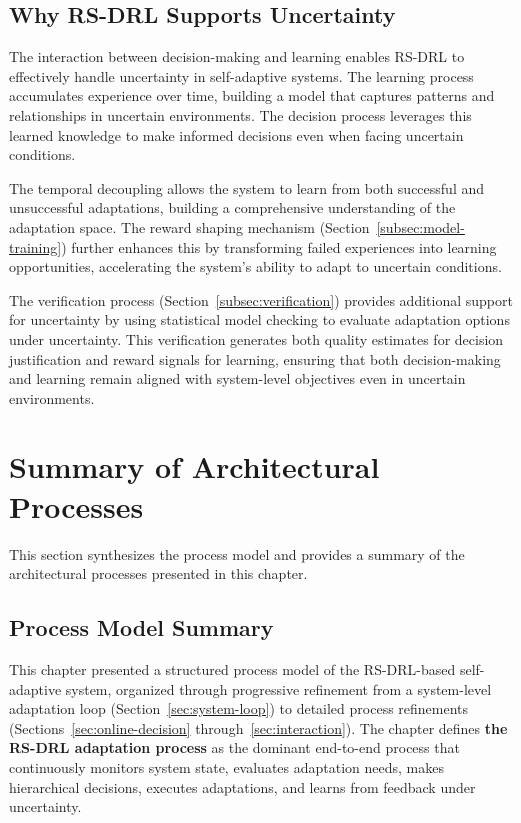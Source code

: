 \documentclass[11pt,a4paper]{article}
\begin{document}
\subsection{Why RS-DRL Supports Uncertainty}

The interaction between decision-making and learning enables RS-DRL to effectively handle uncertainty in self-adaptive systems. The learning process accumulates experience over time, building a model that captures patterns and relationships in uncertain environments. The decision process leverages this learned knowledge to make informed decisions even when facing uncertain conditions.

The temporal decoupling allows the system to learn from both successful and unsuccessful adaptations, building a comprehensive understanding of the adaptation space. The reward shaping mechanism (Section~\ref{subsec:model-training}) further enhances this by transforming failed experiences into learning opportunities, accelerating the system's ability to adapt to uncertain conditions.

The verification process (Section~\ref{subsec:verification}) provides additional support for uncertainty by using statistical model checking to evaluate adaptation options under uncertainty. This verification generates both quality estimates for decision justification and reward signals for learning, ensuring that both decision-making and learning remain aligned with system-level objectives even in uncertain environments.


\section{Summary of Architectural Processes}
\label{sec:summary}

This section synthesizes the process model and provides a summary of the architectural processes presented in this chapter.

\subsection{Process Model Summary}

This chapter presented a structured process model of the RS-DRL-based self-adaptive system, organized through progressive refinement from a system-level adaptation loop (Section~\ref{sec:system-loop}) to detailed process refinements (Sections~\ref{sec:online-decision} through~\ref{sec:interaction}). The chapter defines \textbf{the RS-DRL adaptation process} as the dominant end-to-end process that continuously monitors system state, evaluates adaptation needs, makes hierarchical decisions, executes adaptations, and learns from feedback under uncertainty.
\end{document}
